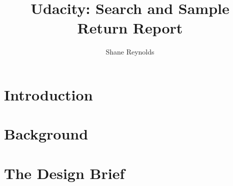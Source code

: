 \documentclass[a4paper]{article}
\begin{document}
\title{Udacity: Search and Sample Return Report}
\author{Shane Reynolds}
\maketitle
\section{Introduction}


\section{Background}


\section{The Design Brief}
\end{document}
